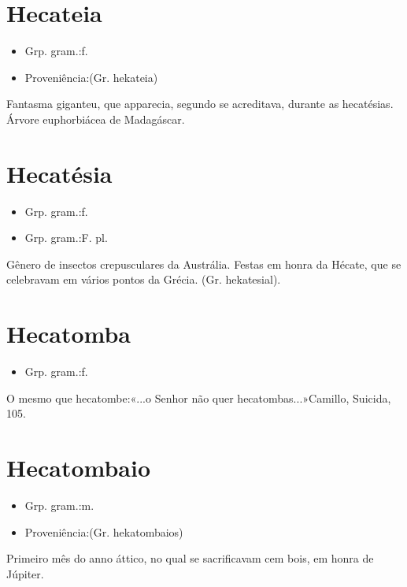 \documentclass{article}
\begin{document}
\section{Hecateia}
\begin{itemize}
\item {Grp. gram.:f.}
\end{itemize}
\begin{itemize}
\item {Proveniência:(Gr. \textunderscore hekateia\textunderscore )}
\end{itemize}
Fantasma giganteu, que apparecia, segundo se acreditava, durante as hecatésias.
Árvore euphorbiácea de Madagáscar.
\section{Hecatésia}
\begin{itemize}
\item {Grp. gram.:f.}
\end{itemize}
\begin{itemize}
\item {Grp. gram.:F. pl.}
\end{itemize}
Gênero de insectos crepusculares da Austrália.
Festas em honra da Hécate, que se celebravam em vários pontos da Grécia.
(Gr. \textunderscore hekatesial\textunderscore ).
\section{Hecatomba}
\begin{itemize}
\item {Grp. gram.:f.}
\end{itemize}
O mesmo que \textunderscore hecatombe\textunderscore :«\textunderscore ...o Senhor não quer hecatombas...\textunderscore »Camillo, \textunderscore Suicida\textunderscore , 105.
\section{Hecatombaio}
\begin{itemize}
\item {Grp. gram.:m.}
\end{itemize}
\begin{itemize}
\item {Proveniência:(Gr. \textunderscore hekatombaios\textunderscore )}
\end{itemize}
Primeiro mês do anno áttico, no qual se sacrificavam cem bois, em honra de Júpiter.
\end{document}
